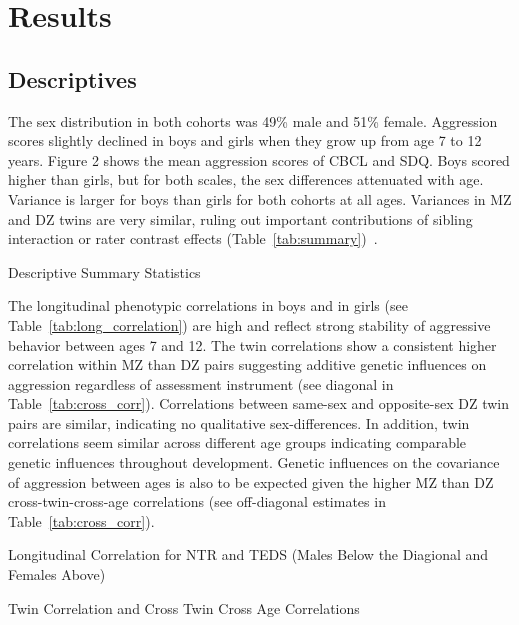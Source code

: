﻿\section{Results}
\subsection{Descriptives}
The sex distribution in both cohorts was 49\% male and 51\% female.
Aggression scores slightly declined in boys and girls when they grow up from age 7 to 12 years.
Figure 2 shows the mean aggression scores of CBCL and SDQ\@.
Boys scored higher than girls, but for both scales, the sex differences attenuated with age.
Variance is larger for boys than girls for both cohorts at all ages.
Variances in MZ and DZ twins are very similar, ruling out important contributions of sibling interaction or rater contrast effects (Table~\ref{tab:summary})~\cite{Eaves1978, Balakrishnan2014}.
\begin{table}[hbt]
  \centering
  \caption{Descriptive Summary Statistics}\label{tab:summary}
\end{table}
The longitudinal phenotypic correlations in boys and in girls (see Table~\ref{tab:long_correlation}) are high and reflect strong stability of aggressive behavior between ages 7 and 12.
The twin correlations show a consistent higher correlation within MZ than DZ pairs suggesting additive genetic influences on aggression regardless of assessment instrument (see diagonal in Table~\ref{tab:cross_corr}).
Correlations between same-sex and opposite-sex DZ twin pairs are similar, indicating no qualitative sex-differences.
In addition, twin correlations seem similar across different age groups indicating comparable genetic influences throughout development.
Genetic influences on the covariance of aggression between ages is also to be expected given the higher MZ than DZ cross-twin-cross-age correlations (see off-diagonal estimates in Table~\ref{tab:cross_corr}). 

\begin{table}
  \centering
  
	\caption{Longitudinal Correlation for NTR and TEDS (Males Below the Diagional and Females Above)}\label{tab:long_correlation}
\end{table}

\begin{landscape}
\begin{table}
  \centering
  \caption{Twin Correlation and Cross Twin Cross Age Correlations}\label{tab:cross_corr}
\end{table}
\end{landscape}
